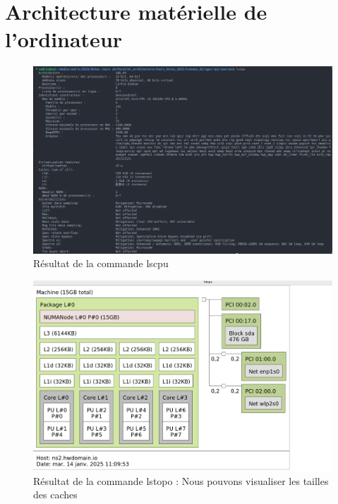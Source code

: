 \documentclass[a4paper,13pt]{book}
\begin{document}
\section{Architecture matérielle de l'ordinateur}
\begin{figure}[!h]
  \begin{center}
  \includegraphics[scale=0.5]{../images/lscpu.png}
  \caption{Résultat de la commande lscpu}
  \label{fig:lscpu}
\end{center}
\end{figure}


\begin{figure}[!h]
  \begin{center}
      \includegraphics[scale=0.3]{../images/lstopo.png}
      \caption{Résultat de la commande lstopo : Nous pouvons visualiser les tailles des caches}
      \label{tab:ls_topo}
  \end{center}
\end{figure}
\clearpage
\end{document}
